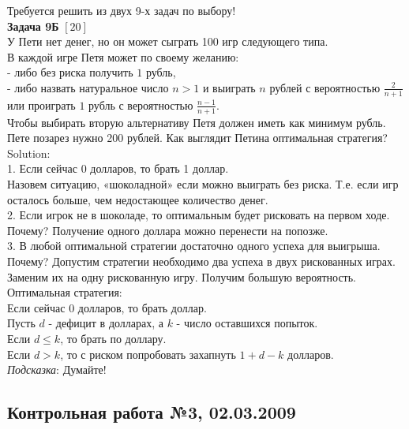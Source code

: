 \documentclass[12pt, a4paper]{article}\usepackage[]{graphicx}\usepackage[]{color}
\begin{document}
Требуется решить \textbf{} из двух 9-х задач по
выбору! \\



\textbf{Задача 9Б} $[20]$ \\
У Пети нет денег, но он может сыграть 100 игр следующего типа. \\
В каждой игре Петя может по своему желанию: \\
- либо без риска получить $1$ рубль, \\
- либо назвать натуральное число $n>1$ и выиграть $n$ рублей с вероятностью $\frac{2}{n+1}$ или проиграть $1$ рубль с вероятностью $\frac{n-1}{n+1}$. \\
Чтобы выбирать вторую альтернативу Петя должен иметь как минимум рубль. Пете позарез нужно 200 рублей. Как выглядит Петина оптимальная стратегия? \\
Solution: \\
1. Если сейчас 0 долларов, то брать 1 доллар. \\
Назовем ситуацию, «шоколадной» если можно выиграть без риска. Т.е. если игр осталось больше, чем недостающее количество денег. \\
2. Если игрок не в шоколаде, то оптимальным будет рисковать на первом ходе. \\
Почему? Получение одного доллара можно перенести на попозже. \\
3. В любой оптимальной стратегии достаточно одного успеха для выигрыша. \\
Почему? Допустим стратегии необходимо два успеха в двух рискованных играх. Заменим их  на одну рискованную игру. Получим большую вероятность. \\
Оптимальная стратегия: \\
Если сейчас 0 долларов, то брать доллар. \\
Пусть $d$ - дефицит в долларах, а $k$ - число оставшихся попыток. \\
Если $d\le k$, то брать по доллару. \\
Если $d>k$, то с риском попробовать захапнуть $1+d-k$ долларов. \\




\emph{Подсказка}: Думайте! \\

\subsection{Контрольная работа №3, 02.03.2009}
\end{document}

